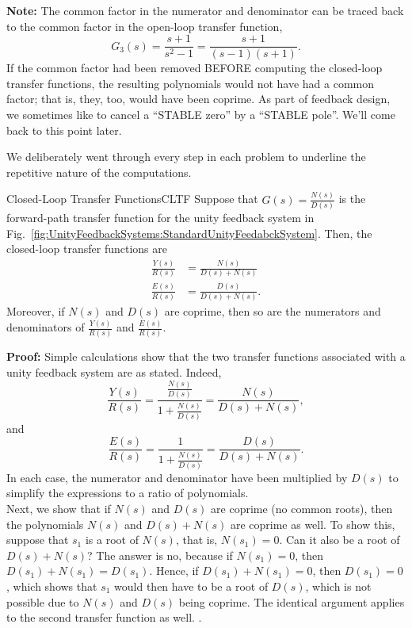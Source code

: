 \textbf{Note:} The common factor in the numerator and denominator can be traced back to the common factor in the open-loop transfer function,
$$G_3(s) = \frac{s+1}{s^2-1} = \frac{s+1}{(s-1)(s+1)}.$$
If the common factor had been removed BEFORE computing the closed-loop transfer functions, the resulting polynomials would not have had a common factor; that is, they, too, would have been coprime. As part of feedback design, we sometimes like to cancel a ``STABLE zero'' by a ``STABLE pole''. We'll come back to this point later. 
\Qed

\bigskip
We deliberately went through every step in each problem to underline the repetitive nature of the computations. 

\bigskip

\begin{propColor}{Closed-Loop Transfer Functions}{CLTF}
Suppose that $G(s)=\frac{N(s)}{D(s)}$ is the forward-path transfer function for the unity feedback system in Fig.~\ref{fig:UnityFeedbackSystems:StandardUnityFeedabckSystem}. Then, the closed-loop transfer functions are
\begin{equation}
    \begin{aligned}
        \frac{Y(s)}{R(s)} & = \frac{N(s)}{D(s) + N(s)} \\[1em]
        \frac{E(s)}{R(s)} & = \frac{D(s)}{D(s) + N(s)}.
    \end{aligned}
\end{equation}
Moreover, if $N(s)$ and $D(s)$ are coprime, then so are the numerators and denominators of $ \frac{Y(s)}{R(s)}$ and $ \frac{E(s)}{R(s)}$.    
\end{propColor}

\textbf{Proof:} Simple calculations show that the two transfer functions associated with a unity feedback system are as stated. Indeed, 
$$
 \frac{Y(s)}{R(s)} = \frac{\frac{N(s)}{D(s)}}{1 + \frac{N(s)}{D(s)}} =  \frac{N(s)}{D(s) + N(s)},
$$
and
$$
 \frac{E(s)}{R(s)} = \frac{1}{1 + \frac{N(s)}{D(s)}} =  \frac{D(s)}{D(s) + N(s)}.
$$
In each case, the numerator and denominator have been multiplied by $D(s)$ to simplify the expressions to a ratio of polynomials.\\

Next, we show that if $N(s)$ and $D(s)$ are coprime (no common roots), then the polynomials $N(s)$ and $D(s) + N(s)$ are coprime as well. To show this, suppose that $s_1$ is a root of $N(s)$, that is, $N(s_1)=0$. Can it also be a root of $D(s) + N(s)$? The answer is no, because if $N(s_1)=0$, then $D(s_1) + N(s_1)= D(s_1)$. Hence, if  $D(s_1) + N(s_1)=0$, then $D(s_1)=0$, which shows that $s_1$ would then have to be a root of $D(s)$, which is not possible due to $N(s)$ and $D(s)$ being coprime. The identical argument applies to the second transfer function as well.
\Qed.

